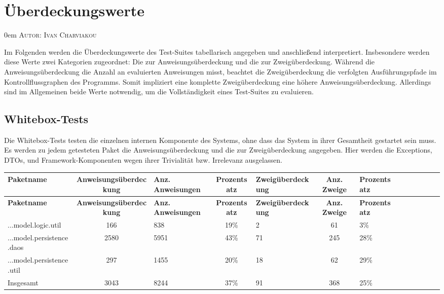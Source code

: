 \documentclass{article}
\makeatletter
\newcommand{\sectionauthor}[1]{
	{\parindent 0em \large \scshape Autor: #1 \par \nobreak \vspace*{1em}}
	\@afterheading
}
\makeatother
\begin{document}
\newpage

\section{Überdeckungswerte}
\sectionauthor{Ivan Charviakou}

Im Folgenden werden die Überdeckungswerte des Test-Suites tabellarisch angegeben und anschließend interpretiert. 
Insbesondere werden diese Werte zwei Kategorien zugeordnet: Die zur Anweisungsüberdeckung und die zur Zweigüberdeckung. 
Während die Anweisungsüberdeckung die Anzahl an evaluierten Anweisungen misst, beachtet die Zweigüberdeckung die verfolgten Ausführungspfade im Kontrollflussgraphen des Programms.
Somit impliziert eine komplette Zweigüberdeckung eine höhere Anweisungsüberdeckung. 
Allerdings sind im Allgemeinen beide Werte notwendig, um die Vollständigkeit eines Test-Suites zu evaluieren.

\subsection{Whitebox-Tests}

Die Whitebox-Tests testen die einzelnen internen Komponente des Systems, ohne dass das System in ihrer Gesamtheit gestartet sein muss. 
Es werden zu jedem getesteten Paket die Anweisungsüberdeckung und die zur Zweigüberdeckung angegeben. 
Hier werden die Exceptions, DTOs, und Framework-Komponenten wegen ihrer Trivialität bzw. Irrelevanz ausgelassen.

\begin{longtable}{@{}lclclclclclcl@{}}
\toprule
\textbf{Paketname} & \textbf{Anweisungsüberdeckung} & \textbf{Anz. Anweisungen} & \textbf{Prozentsatz} & \textbf{Zweigüberdeckung} & \textbf{Anz. Zweige} & \textbf{Prozentsatz} \\* \midrule
\endfirsthead
\textbf{Paketname} & \textbf{Anweisungsüberdeckung} & \textbf{Anz. Anweisungen} & \textbf{Prozentsatz} & \textbf{Zweigüberdeckung} & \textbf{Anz. Zweige} & \textbf{Prozentsatz} \\* \midrule
\endhead
...model.logic.util 			& 166 		& 838 		& 19\% 		& 2 			& 61 			& 3\% \\
...model.persistence.daos 		& 2580 		& 5951 		& 43\% 		& 71 			& 245 		& 28\% \\
...model.persistence.util 		& 297 		& 1455 		& 20\% 		& 18 			& 62 			& 29\% \\
Insgesamt 						& 3043 		& 8244 		& 37\% 		& 91 			& 368 		& 25\% \\* \bottomrule
\end{longtable}
\end{document}
